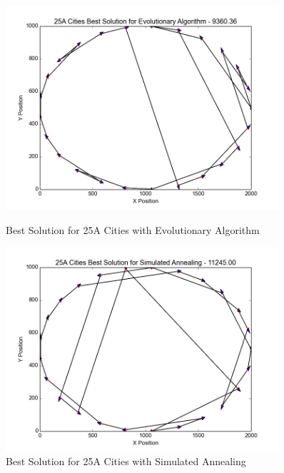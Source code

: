 
\begin{figure}[H]
	\centering
    \begin{minipage}{0.45\textwidth}
        \centering
        \includegraphics[width=0.9\textwidth]{25ACity_EA.png} %
        \caption{Best Solution for 25A Cities with Evolutionary Algorithm}
        \label{fig:25Acity_EA}
    \end{minipage}\hfill
    \begin{minipage}{0.45\textwidth}
        \centering
        \includegraphics[width=0.9\textwidth]{25ACity_SA.png} %
        \caption{Best Solution for 25A Cities with Simulated Annealing}
        \label{fig:25Acity_SA}
    \end{minipage}\hfill
    \begin{minipage}{0.45\textwidth}

\end{minipage}
\end{figure}
